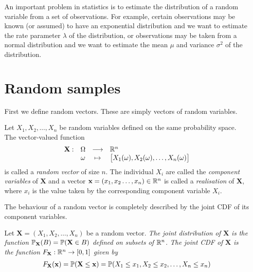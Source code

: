 
An important problem in statistics is to estimate the distribution of a random variable from a set of observations. For example, certain observations may be known (or assumed) to have an exponential distribution and we want to estimate the rate parameter $\lambda$ of the distribution, or observations may be taken from a normal distribution and we want to estimate the mean $\mu$ and variance $\sigma^2$ of the distribution.

\section{Random samples}\label{sec:random_samples}

First we define random vectors. These are simply vectors of random variables.

\begin{definition}\label{def:random_vector}
Let $X_1,X_2,\ldots,X_n$ be random variables defined on the same probability space. The vector-valued function
\[
\begin{array}{rccl}
\mathbf{X}:	& \Omega 	& \longrightarrow 		& \mathbb{R}^n \\
			& \omega	& \mapsto	& \big[X_1(\omega), X_2(\omega),\ldots, X_n(\omega)\big]
\end{array}
\]
is called a \emph{random vector} of size $n$. The individual $X_i$ are called the \emph{component variables} of $\mathbf{X}$ and a vector $\mathbf{x} = (x_1,x_2\ldots,x_n)\in\mathbb{R}^n$ is called a \emph{realisation} of $\mathbf{X}$, where $x_i$ is the value taken by the corresponding component variable $X_i$.
\end{definition}

The behaviour of a random vector is completely described by the joint CDF of its component variables.
\begin{definition}
Let $\mathbf{X}=(X_1,X_2,\ldots,X_n)$ be a random vector.
\ben
\it 
The \emph{joint distribution} of $\mathbf{X}$ is the function $\mathbb{P}_{\mathbf{X}}(B) = \mathbb{P}(\mathbf{X}\in B)$ defined on subsets of $\mathbb{R}^n$.
\it
The \emph{joint CDF} of $\mathbf{X}$ is the function $F_{\mathbf{X}}:\mathbb{R}^n\to[0,1]$ given by
\begin{align*}
F_{\mathbf{X}}(\mathbf{x}) 	= \mathbb{P}(\mathbf{X}\leq\mathbf{x})
							& = \mathbb{P}(X_1\leq x_1, X_2\leq x_2, \ldots, X_n\leq x_n) \\
\end{align*}
\een
\end{definition}

